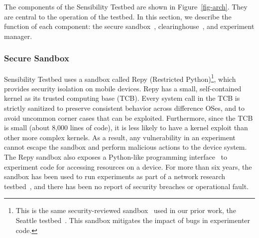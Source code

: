 The components of the Sensibility Testbed are shown in Figure~\ref{fig-arch}.
They are central to the operation of the testbed. 
In this section, we describe the function of each component: the
secure sandbox~\cite{cappos2010retaining}, clearinghouse~\cite{ch}, 
and experiment manager.

\subsubsection{Secure Sandbox}\label{sec-repy}

Sensibility Testbed uses a sandbox called Repy (Restricted 
Python)\footnote{\scriptsize This is the 
same security-reviewed sandbox~\cite{cappos2010retaining} used in
our prior work, the Seattle testbed~\cite{seattle}. This sandbox
mitigates the impact of bugs in experimenter code.}, which 
provides security isolation on mobile devices.
Repy has a small, self-contained kernel as its trusted 
computing base (TCB). %
Every system call in the TCB is strictly 
sanitized to preserve consistent behavior across difference OSes, 
and to avoid uncommon corner cases that can be exploited. 
Furthermore, since the TCB is small (about 8,000 lines of code), it is 
less likely to have a kernel exploit than other more complex kernels. 
As a result, any vulnerability in an experiment 
cannot escape the sandbox and perform malicious actions to 
the device system. The Repy sandbox also exposes a Python-like 
programming interface~\cite{repyv2} to experiment code 
for accessing resources on a device. 
For more than six years, the
sandbox has been used to run experiments as part of a network research 
testbed~\cite{seattle}, and there has been no report of security 
breaches or operational fault. 

